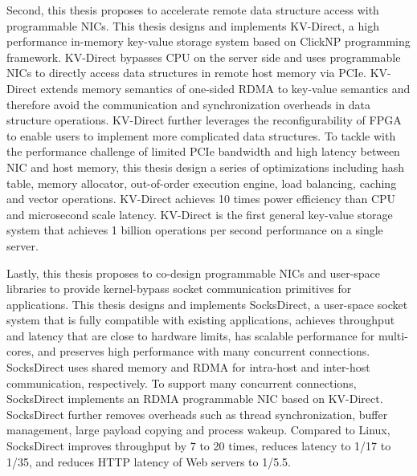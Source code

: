 \begin{enabstract}
Second, this thesis proposes to accelerate remote data structure access with programmable NICs.
This thesis designs and implements KV-Direct, a high performance in-memory key-value storage system based on ClickNP programming framework.
KV-Direct bypasses CPU on the server side and uses programmable NICs to directly access data structures in remote host memory via PCIe.
KV-Direct extends memory semantics of one-sided RDMA to key-value semantics and therefore avoid the communication and synchronization overheads in data structure operations.
KV-Direct further leverages the reconfigurability of FPGA to enable users to implement more complicated data structures.
To tackle with the performance challenge of limited PCIe bandwidth and high latency between NIC and host memory, this thesis design a series of optimizations including hash table, memory allocator, out-of-order execution engine, load balancing, caching and vector operations.
KV-Direct achieves 10 times power efficiency than CPU and microsecond scale latency.
KV-Direct is the first general key-value storage system that achieves 1 billion operations per second performance on a single server.

Lastly, this thesis proposes to co-design programmable NICs and user-space libraries to provide kernel-bypass socket communication primitives for applications.
This thesis designs and implements SocksDirect, a user-space socket system that is fully compatible with existing applications, achieves throughput and latency that are close to hardware limits, has scalable performance for multi-cores, and preserves high performance with many concurrent connections.
SocksDirect uses shared memory and RDMA for intra-host and inter-host communication, respectively.
To support many concurrent connections, SocksDirect implements an RDMA programmable NIC based on KV-Direct.
SocksDirect further removes overheads such as thread synchronization, buffer management, large payload copying and process wakeup.
Compared to Linux, SocksDirect improves throughput by 7 to 20 times, reduces latency to 1/17 to 1/35, and reduces HTTP latency of Web servers to 1/5.5.

\end{enabstract}
